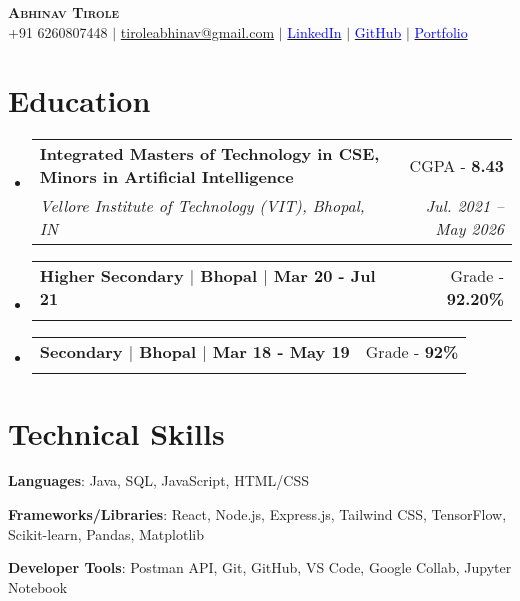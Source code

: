 \documentclass[letterpaper,11pt]{article}
\makeatletter
\newcommand{\resumeSubheading}[4]{
  \vspace{-2pt}\item
    \begin{tabular*}{0.97\textwidth}[t]{l@{\extracolsep{\fill}}r}
      \textbf{#1} & #2 \\
      \textit{\small#3} & \textit{\small #4} \\
    \end{tabular*}\vspace{-7pt}
}
\newcommand{\resumeSubHeadingListStart}{\begin{itemize}[leftmargin=0.15in, label={}]}
\newcommand{\resumeSubHeadingListEnd}{\end{itemize}}
\makeatother
\begin{document}

\begin{center}
    \textbf{\Huge \scshape Abhinav Tirole} \\ \vspace{2pt}
    \small +91 6260807448 $|$ \href{mailto:tiroleabhinav@gmail.com}{{tiroleabhinav@gmail.com}} $|$ 
    \href{https://www.linkedin.com/in/abhinavtirole2003/}{\textcolor{blue}{LinkedIn}} $|$
    \href{https://github.com/ABHINAV2087}{\textcolor{blue}{GitHub}} $|$ \href{www.abhinavtirole.tech}{\textcolor{blue}{Portfolio}}
\end{center}


\section{Education}
 \resumeSubHeadingListStart
    \resumeSubheading
      {Integrated Masters of Technology in CSE, Minors in Artificial Intelligence}{CGPA - \textbf{8.43}}
      {Vellore Institute of Technology (VIT), Bhopal, IN}{Jul. 2021 -- May 2026}
    \resumeSubheading
      {Higher Secondary $|$ Bhopal $|$ Mar 20 - Jul 21}{Grade - \textbf{92.20\%}}
      {\vspace{-2mm}}{\vspace{-2mm}}
       \vspace{-2mm}
    \resumeSubheading
      {Secondary $|$ Bhopal $|$ Mar 18 - May 19}{Grade - \textbf{92\%}}
      {\vspace{-2mm}}{\vspace{-2mm}}
\resumeSubHeadingListEnd


\section{Technical Skills}
\begin{itemize}[leftmargin=0.15in, label={}, itemsep=2pt, parsep=2pt]
    \small{
        \item \textbf{Languages}:  Java, SQL, JavaScript, HTML/CSS  
        \item \textbf{Frameworks/Libraries}:  React, Node.js, Express.js, Tailwind CSS, TensorFlow, Scikit-learn, Pandas, Matplotlib  
        \item \textbf{Developer Tools}:  Postman API, Git, GitHub, VS Code, Google Collab, Jupyter Notebook 
         
    }
\end{itemize}
\end{document}

